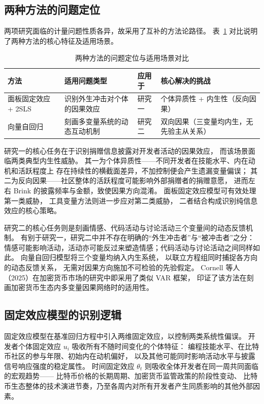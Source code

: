 \subsection{两种方法的问题定位}

两项研究面临的计量问题性质各异，故采用了互补的方法论路径。
表~\ref{tab:method-comparison} 对比说明了两种方法的核心特征及适用场景。

\begin{table}[htbp]
    \centering
    \caption{两种方法的问题定位与适用场景对比}
    \label{tab:method-comparison}
    \begin{tabularx}{\textwidth}{lXXX}
        \toprule
        方法 & 适用问题类型 & 应用于 & 核心解决的挑战 \\
        \midrule
        面板固定效应 + 2SLS
            & 识别外生冲击对个体的因果效应
            & 研究一
            & 个体异质性 + 内生性（反向因果）\\
        向量自回归
            & 刻画多变量系统的动态互动机制
            & 研究二
            & 双向因果（三变量均内生，无先验主从关系）\\
        \bottomrule
    \end{tabularx}
\end{table}

研究一的核心任务在于识别捐赠信息披露对开发者活动的因果效应，
而该场景面临两类典型内生性威胁。
其一为个体异质性——不同开发者在技能水平、内在动机和活跃程度上
存在持续性的横截面差异，不加控制便会产生遗漏变量偏误；
其二为反向因果——社区整体的活跃程度可能影响外部捐赠者的捐赠意愿，
进而左右 Brink 的披露频率与金额，致使因果方向混淆。
面板固定效应模型可有效处理第一类威胁，
工具变量方法则进一步应对第二类威胁，
二者结合构成识别纯信息效应的核心策略。

研究二的核心任务则是刻画情感、代码活动与讨论活动三个变量间的动态反馈机制。
有别于研究一，研究二中并不存在明确的“外生冲击者”与“被冲击者”之分：
情感可能影响活动，活动亦可能反过来塑造情感；代码活动与讨论活动之间同样如此。
向量自回归模型将三个变量均纳入内生系统，
以联立方程组同时捕捉各方向的动态反馈关系，
无需对因果方向施加不可检验的先验假定\cite{sims1980macroeconomics}。
Cornell 等人（2025）在加密货币市场的研究中即采用了类似 VAR 框架，
印证了该方法在刻画加密货币生态内多变量因果网络时的适用性\cite{cornell2025vector}。

\subsection{固定效应模型的识别逻辑}

固定效应模型在基准回归方程中引入两维固定效应，以控制两类系统性偏误。
开发者个体固定效应 $u_i$ 吸收所有不随时间变化的个体特征：
编程技能水平、在比特币社区的参与年限、初始内在动机偏好，
以及其他可能同时影响活动水平与披露信号响应强度的稳定属性。
时间固定效应 $\theta_t$ 则吸收全体开发者在同一周共同面临的宏观趋势——
比特币价格的长期周期、加密货币监管政策的阶段性变动、
比特币生态整体的技术演进节奏，乃至各周内对所有开发者产生同质影响的其他外部因素。

